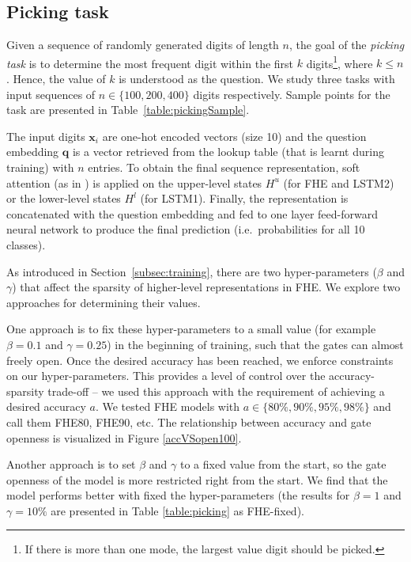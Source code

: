 \subsection{Picking task}

Given a sequence of randomly generated digits of length $n$, the goal of the \emph{picking task} is to determine the most frequent digit within the first $k$ digits\footnote{If there is more than one  mode, the largest value digit should be picked.}, where $k \leq n$. Hence, the value of $k$ is understood as the question. We study three tasks with input sequences of $n \in \{100, 200, 400\}$ digits respectively. Sample points for the task are presented in Table~\ref{table:pickingSample}.

The input digits $\mathbf{x}_i$ are one-hot encoded vectors (size 10) and the question embedding $\mathbf{q}$ is a vector retrieved from the lookup table (that is learnt during training) with $n$ entries. To obtain the final sequence representation, soft attention (as in \citet{bahdanau2014}) is applied on the upper-level states $H^u$ (for FHE and LSTM2) or the lower-level states $H^l$ (for LSTM1). Finally, the representation is concatenated with the question embedding and fed to one layer feed-forward neural network to produce the final prediction (i.e.\, probabilities for all 10 classes).

As introduced in Section~\ref{subsec:training}, there are two hyper-parameters ($\beta$ and $\gamma$) that affect the sparsity of higher-level representations in FHE. We explore two approaches for determining their values.

One approach is to fix these hyper-parameters to a small value (for example  $\beta = 0.1$ and $\gamma = 0.25$) in the beginning of training, such that the gates can almost freely open. Once the desired accuracy has been reached, we enforce constraints on our hyper-parameters. This provides a level of control over the accuracy-sparsity trade-off -- we used this approach  with the requirement of achieving a desired accuracy $a$. We tested FHE models with \mbox{$a \in \{80\%, 90\%, 95\%, 98\%\}$} and call them FHE80, FHE90, etc. The relationship between accuracy and gate openness is visualized in Figure \ref{accVSopen100}. 

Another approach is to set $\beta$ and $\gamma$ to a fixed value from the start, so the gate openness of the model is more restricted right from the start. We find that the model performs better with fixed the hyper-parameters (the results for $\beta = 1$ and $\gamma = 10\%$ are presented in Table \ref{table:picking} as FHE-fixed).

